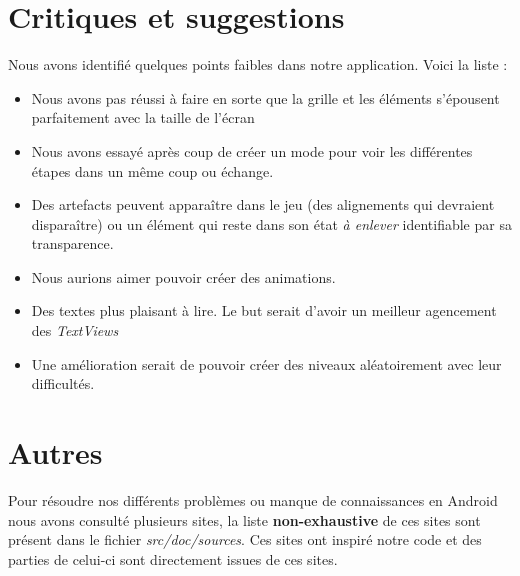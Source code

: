 \section{Critiques et suggestions}
Nous avons identifié quelques points faibles dans notre application. Voici la liste : 
\begin{itemize}
\item Nous avons pas réussi à faire en sorte que la grille et les éléments s'épousent parfaitement avec la taille de l'écran
\item Nous avons essayé après coup de créer un mode pour voir les différentes étapes dans un même coup ou échange.  
\item Des artefacts peuvent apparaître dans le jeu (des alignements qui devraient disparaître) ou un élément qui reste dans son état \textit{à enlever} identifiable par sa transparence.
\item Nous aurions aimer pouvoir créer des animations.
\item Des textes plus plaisant à lire. Le but serait d'avoir un meilleur agencement des \textit{TextViews}
\item Une amélioration serait de pouvoir créer des niveaux aléatoirement avec leur difficultés.  
\end{itemize}

\section{Autres}
Pour résoudre nos différents problèmes ou manque de connaissances en Android nous avons consulté plusieurs sites, la liste \textbf{non-exhaustive} de ces sites sont présent dans le fichier \textit{src/doc/sources}. Ces sites ont inspiré notre code et des parties de celui-ci sont directement issues de ces sites.
